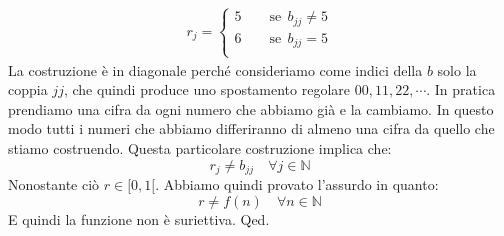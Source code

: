 {\begin{align*}
	r_{j} = 
	\begin{cases}
		5 \qquad \mathrm{se}\;\,b_{jj} \neq 5\\
		6 \qquad \mathrm{se}\;\,b_{jj} = 5\\
	\end{cases}
\end{align*}
La costruzione è in diagonale perché consideriamo come indici della $b$ solo la 
coppia $jj$, che quindi produce uno spostamento regolare $00, 11, 22, \cdots$. 
In pratica prendiamo una cifra da ogni numero che abbiamo già e la cambiamo. 
In questo modo tutti i numeri che abbiamo differiranno di almeno una cifra da 
quello che stiamo costruendo. Questa particolare costruzione implica che:
\begin{equation*}
	r_j \neq b_{jj} \quad \forall j \in \mathbb{N}
\end{equation*}
Nonostante ciò $r \in [0,1[$. Abbiamo quindi provato l'assurdo in quanto:
\begin{equation*}
	r \neq f(n) \quad \forall n \in \mathbb{N}
\end{equation*}
E quindi la funzione non è suriettiva.
\hfill Qed.

}
